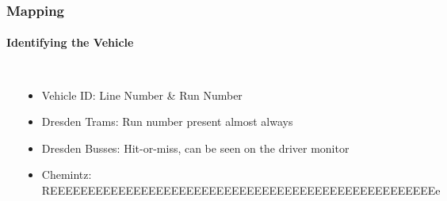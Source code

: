 \begin{frame}
  \frametitle{Mapping}
  \framesubtitle{Identifying the Vehicle}
    \begin{columns}
      \column{.4\pagewidth}
      \centering
      \includegraphics[width=.8\columnwidth]{./figs/tram-id-dresden.png}
      \column{.6\pagewidth}
    \begin{itemize}
      \item Vehicle ID: Line Number \& Run Number
      \item Dresden Trams: Run number present almost always
      \item Dresden Busses: Hit-or-miss, can be seen on the driver monitor
      \item Chemintz: REEEEEEEEEEEEEEEEEEEEEEEEEEEEEEEEEEEEEEEEEEEEEEEEEEEe
    \end{itemize}
    \end{columns}
\end{frame}

